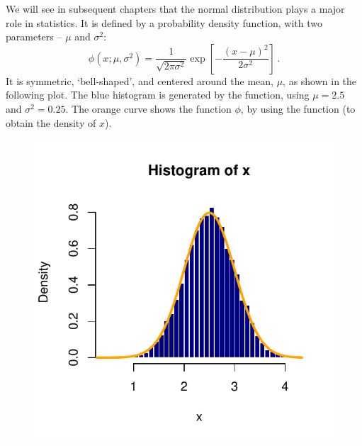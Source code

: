 We will see in subsequent chapters that the normal distribution plays a major role in statistics. It is defined by a probability density function, with two parameters -- $\mu$ and $\sigma^2$:
$$\phi(x; \mu,\sigma^2)=\frac{1}{\sqrt{2\pi\sigma^2}}\exp\left[-\frac{(x-\mu)^2}{2\sigma^2}\right]\,.$$
It is symmetric, `bell-shaped', and centered around the mean, $\mu$, as shown in the following plot. The blue histogram is generated by the  function, using $\mu=2.5$ and $\sigma^2=0.25$. The orange curve shows the function $\phi$, by using the  function (to obtain the density of $x$).
\begin{knitrout}
\color{fgcolor}\begin{kframe}
\begin{alltt}
 \hlkwb{<-} \hlstd{(}\hlstd{,} \hlstd{=}\hlstd{,} \hlstd{=}\hlstd{)}
 \hlstd{=}\hlstd{,} \hlstd{=}\hlstd{,} \hlstd{=}\hlstd{,} \hlstd{=}\hlstd{)}
 \hlkwb{<-}  \hlstd{(}\hlstd{,}\hlstd{,} \hlstd{=}\hlstd{)}
 \hlstd{,} \hlstd{),} \hlstd{=}\hlstd{,} \hlstd{=}\hlstd{)}
\end{alltt}
\end{kframe}\begin{figure}

{\centering \includegraphics[width=\maxwidth]{figure/intro-rnorm1-1} 

}
\end{figure}
\end{knitrout}
